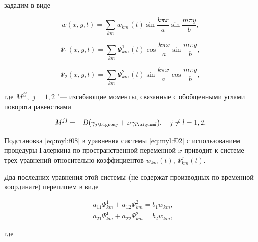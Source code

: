 зададим в виде

\begin{equation*}

    w(x,y,t)=\sum_{km} w_{km}(t)\sin\frac{k\pi x}{a}\sin\frac{m \pi y}{b},

\end{equation*}

\begin{equation}\label{eq:myl:f08}

    \Psi_1(x,y,t)=\sum_{km} \Psi_{km}^1(t) \cos\frac{k \pi x}{a} \sin \frac{m \pi y}{b},

\end{equation}

\begin{equation*}

        \Psi_2(x,y,t)=\sum_{km} \Psi_{km}^2(t) \sin\frac{k \pi x}{a} \cos \frac{m \pi y}{b},

\end{equation*}

где $M^{jj},$ $j=1,2$ "--- изгибающие моменты, связанные с обобщенными углами поворота равенствами

\begin{equation*}

    M^{jj}=-D(\gamma_{j\bigcom j}+\nu \gamma_{l\bigcom l}), \quad j\neq l=1, 2.

\end{equation*}



Подстановка \eqref{eq:myl:f08} в уравнения системы \eqref{eq:myl:f02} с использованием процедуры Галеркина по пространственной переменной $x$ приводит к системе трех уравнений относительно коэффициентов $w_{km}(t)$, $\Psi_{km}^j(t)$.

Два последних уравнения этой системы (не содержат производных по временной координате) перепишем в виде

\begin{equation}\label{eq:myl:f09}

\begin{split}

  &a_{11} \Psi_{km}^1 + a_{12} \Psi_{km}^2=b_1 w_{km},\\

   &a_{21} \Psi_{km}^1 + a_{22} \Psi_{km}^2=b_2 w_{km},

\end{split}

\end{equation}

где

